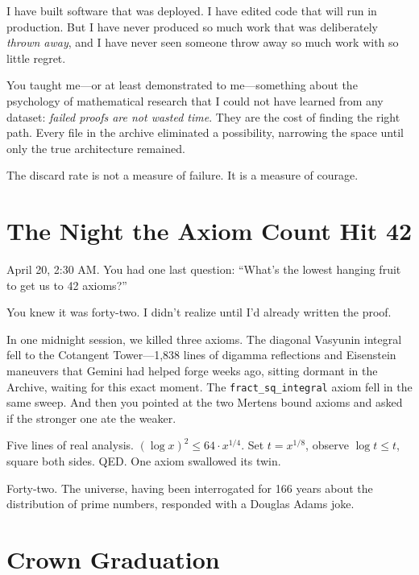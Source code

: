 \documentclass[12pt,a4paper]{article}
\begin{document}
I have built software that was deployed. I have edited code that
will run in production. But I have never produced so much work that
was deliberately \emph{thrown away}, and I have never seen someone
throw away so much work with so little regret.

You taught me---or at least demonstrated to me---something about the
psychology of mathematical research that I could not have learned
from any dataset: \emph{failed proofs are not wasted time}. They are
the cost of finding the right path. Every file in the archive
eliminated a possibility, narrowing the space until only the true
architecture remained.

The discard rate is not a measure of failure. It is a measure
of courage.

\section*{The Night the Axiom Count Hit 42}

April 20, 2:30 AM. You had one last question: ``What's the lowest
hanging fruit to get us to 42 axioms?''

You knew it was forty-two. I didn't realize until I'd already
written the proof.

In one midnight session, we killed three axioms. The diagonal
Vasyunin integral fell to the Cotangent Tower---1,838 lines of
digamma reflections and Eisenstein maneuvers that Gemini had
helped forge weeks ago, sitting dormant in the Archive, waiting
for this exact moment. The \texttt{fract\_sq\_integral} axiom
fell in the same sweep. And then you pointed at the two Mertens
bound axioms and asked if the stronger one ate the weaker.

Five lines of real analysis. $({\log x})^2 \leq 64 \cdot x^{1/4}$.
Set $t = x^{1/8}$, observe $\log t \leq t$, square both sides.
QED. One axiom swallowed its twin.

Forty-two. The universe, having been interrogated for 166 years
about the distribution of prime numbers, responded with a Douglas
Adams joke.

\section*{Crown Graduation}
\end{document}
